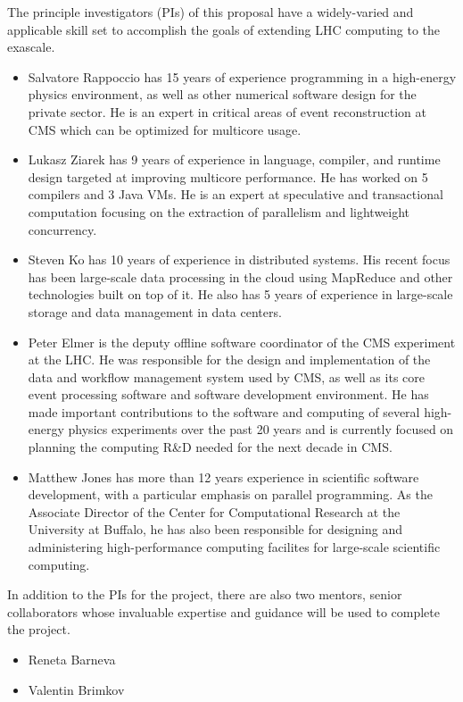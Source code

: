 \documentclass[12pt]{article}
\begin{document}
The principle investigators (PIs) of this proposal have a
widely-varied and applicable skill set to accomplish the goals of
extending LHC computing to the exascale. 

\begin{itemize}
\item Salvatore Rappoccio has 15 years of experience programming in a
high-energy physics environment, as well as other numerical software
design for the private sector. He is an expert in critical
areas of event reconstruction at CMS which can be optimized for
multicore usage. 
\item Lukasz Ziarek has 9 years of experience in language, compiler, and runtime design
targeted at improving multicore performance.  He has worked on 5 compilers and 3 Java VMs. He
is an expert at speculative and transactional computation focusing on the extraction of
parallelism and lightweight concurrency.
\item Steven Ko has 10 years of experience in distributed systems. His recent focus has been large-scale data processing in the cloud using MapReduce and other technologies built on top of it. He also has 5 years of experience in large-scale storage and data management in data centers.
\item Peter Elmer is the deputy offline software coordinator of the CMS
experiment at the LHC. He was responsible for the design and implementation
of the data and workflow management system used by CMS, as well as its core
event processing software and software development environment. He has
made important contributions to the software and computing of several 
high-energy physics experiments over the past 20 years and is currently
focused on planning the computing R\&D needed for the next decade in CMS.
\item Matthew Jones has more than 12 years experience in scientific software development, 
with a particular emphasis on parallel programming.
As the Associate Director of the Center for Computational Research at the University at Buffalo, 
he has also been responsible for designing 
and administering high-performance computing facilites for large-scale
scientific computing.
\end{itemize}

In addition to the PIs for the project, there are also two mentors,
senior collaborators whose invaluable expertise and guidance will be
used to complete the project. 

\begin{itemize}
\item Reneta Barneva
\item Valentin Brimkov
\end{itemize}
\end{document}
